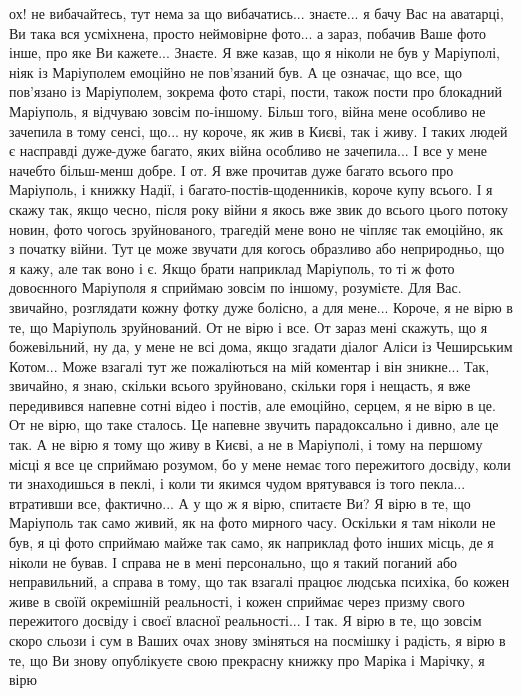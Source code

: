 ох! не вибачайтесь, тут нема за що вибачатись... знаєте... я бачу Вас на
аватарці, Ви така вся усміхнена, просто неймовірне фото... а зараз, побачив
Ваше фото інше, про яке Ви кажете... Знаєте. Я вже казав, що я ніколи не був у
Маріуполі, ніяк із Маріуполем емоційно не пов'язаний був. А це означає, що все,
що пов'язано із Маріуполем, зокрема фото старі, пости, також пости про
блокадний Маріуполь, я відчуваю зовсім по-іншому. Більш того, війна мене
особливо не зачепила в тому сенсі, що... ну короче, як жив в Києві, так і живу.
І таких людей є насправді дуже-дуже багато, яких війна особливо не зачепила...
І все у мене начебто більш-менш добре. І от. Я вже прочитав дуже багато всього
про Маріуполь, і книжку Надії, і багато-постів-щоденників, короче купу всього.
І я скажу так, якщо чесно, після року війни я якось вже звик до всього цього
потоку новин, фото чогось зруйнованого, трагедій мене воно не чіпляє так
емоційно, як з початку війни. Тут це може звучати для когось образливо або
неприродньо, що я кажу, але так воно і є. Якщо брати наприклад Маріуполь, то ті
ж фото довоєнного Маріуполя я сприймаю зовсім по іншому, розумієте. Для Вас.
звичайно, розглядати кожну фотку дуже болісно, а для мене... Короче, я не вірю
в те, що Маріуполь зруйнований. От не вірю і все. От зараз мені скажуть, що я
божевільний, ну да, у мене не всі дома, якщо згадати діалог Аліси із Чеширським
Котом... Може взагалі тут же пожаліються на мій коментар і він зникне... Так,
звичайно, я знаю, скільки всього зруйновано, скільки горя і нещасть, я вже
передивився напевне сотні відео і постів, але емоційно, серцем, я не вірю в це.
От не вірю, що таке сталось. Це напевне звучить парадоксально і дивно, але це
так. А не вірю я тому що живу в Києві, а не в Маріуполі, і тому на першому
місці я все це сприймаю розумом, бо у мене немає того пережитого досвіду, коли
ти знаходишься в пеклі, і коли ти якимся чудом врятувався із того пекла...
втративши все, фактично... А у що ж я вірю, спитаєте Ви? Я вірю в те, що
Маріуполь так само живий, як на фото мирного часу. Оскільки я там ніколи не
був, я ці фото сприймаю майже так само, як наприклад фото інших місць, де я
ніколи не бував. І справа не в мені персонально, що я такий поганий або
неправильний, а справа в тому, що так взагалі працює людська психіка, бо кожен
живе в своїй окремішній реальності, і кожен сприймає через призму свого
пережитого досвіду і своєї власної реальності... І так. Я вірю в те, що зовсім
скоро сльози і сум в Ваших очах знову зміняться на посмішку і радість, я вірю в
те, що Ви знову опублікуєте свою прекрасну книжку про Маріка і Марічку, я вірю
